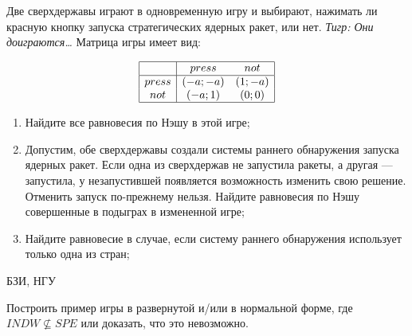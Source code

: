 \begin{problem}
Две сверхдержавы играют в одновременную игру и выбирают, нажимать ли красную кнопку запуска стратегических ядерных ракет, или нет. {\it Тигр: Они доиграются\ldots } Матрица игры имеет вид:\par
\[\begin{array}{|c|cc|}  \hline {} & {press} & {not} \\  \hline {press} & {\left(-a;-a\right)} & {\left(1;-a\right)} \\ {not} & {\left(-a;1\right)} & {\left(0;0\right)} \\  \hline  \end{array}\]
\begin{enumerate}
\item  Найдите все равновесия по Нэшу в этой игре;\par
\item Допустим, обе сверхдержавы создали системы раннего обнаружения запуска ядерных ракет. Если одна из сверхдержав не запустила ракеты, а другая --- запустила, у незапустившей появляется возможность изменить свою решение. Отменить запуск по-прежнему нельзя. Найдите равновесия по Нэшу совершенные в подыграх в измененной игре;\par
\item  Найдите равновесие в случае, если систему раннего обнаружения использует только одна из стран;\par
\end{enumerate}


\begin{sol}

\end{sol}
\end{problem}




\begin{problem}
\begin{source}
БЗИ, НГУ
\end{source}
{\rm
Построить пример игры в развернутой и/или в нормальной
форме, где $INDW \not\subseteq SPE$ или доказать, что это
невозможно. }



\begin{sol}

\end{sol}
\end{problem}







